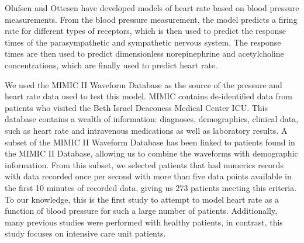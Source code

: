 \documentclass[fleqn,10pt]{wlscirep}
\begin{document}
Olufsen and Ottesen have developed models of heart rate based on blood pressure measurements.\cite{olufsen2013practical} From the blood pressure measurement, the model predicts a firing rate for different types of receptors, which is then used to predict the response times of the parasympathetic and sympathetic nervous system. The response times are then used to predict dimensionless norepinephrine and acetylcholine concentrations, which are finally used to predict heart rate. 

We used the MIMIC II Waveform Database as the source of the pressure and heart rate data used to test this model.\cite{saeed2011multiparameter} MIMIC contains de-identified data from patients who visited the Beth Israel Deaconess Medical Center ICU. This database contains a wealth of information: diagnoses, demographics, clinical data, such as heart rate and intravenous medications as well as laboratory results.  
A subset of the MIMIC II Waveform Database has been linked to patients found in the MIMIC II Database, allowing us to combine the waveforms with demographic information. From this subset, we selected patients that had numerics records with data recorded once per second with more than five data points available in the first 10 minutes of recorded data, giving us 273 patients meeting this criteria.
To our knowledge, this is the first study to attempt to model heart rate as a function of blood pressure for such a large number of patients. Additionally, many previous studies were performed with healthy patients, in contrast, this study focuses on intensive care unit patients. 
\end{document}
